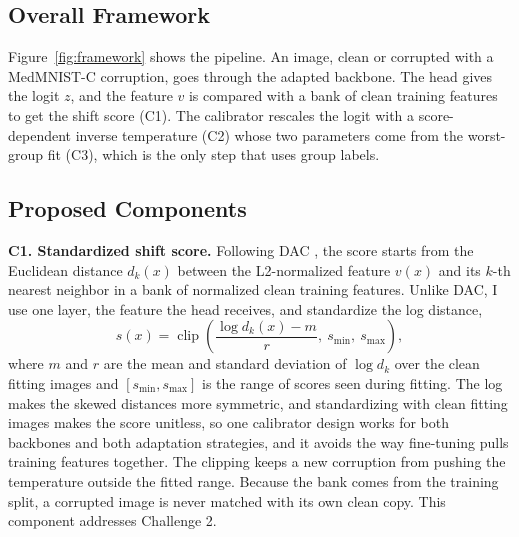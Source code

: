 \documentclass[sigconf,nonacm]{acmart}
\begin{document}
\subsection{Overall Framework}

Figure~\ref{fig:framework} shows the pipeline. An image, clean or corrupted with a MedMNIST-C corruption, goes through the adapted backbone. The head gives the logit $z$, and the feature $v$ is compared with a bank of clean training features to get the shift score (C1). The calibrator rescales the logit with a score-dependent inverse temperature (C2) whose two parameters come from the worst-group fit (C3), which is the only step that uses group labels.

\subsection{Proposed Components}
\label{sec:components}

\textbf{C1. Standardized shift score.} Following DAC \cite{tomani2023dac}, the score starts from the Euclidean distance $d_k(x)$ between the L2-normalized feature $v(x)$ and its $k$-th nearest neighbor in a bank of normalized clean training features. Unlike DAC, I use one layer, the feature the head receives, and standardize the log distance,
\begin{equation}
  s(x) = \operatorname{clip}\left(\frac{\log d_k(x) - m}{r},\ s_{\min},\ s_{\max}\right),
  \label{eq:score}
\end{equation}
where $m$ and $r$ are the mean and standard deviation of $\log d_k$ over the clean fitting images and $[s_{\min}, s_{\max}]$ is the range of scores seen during fitting. The log makes the skewed distances more symmetric, and standardizing with clean fitting images makes the score unitless, so one calibrator design works for both backbones and both adaptation strategies, and it avoids the way fine-tuning pulls training features together. The clipping keeps a new corruption from pushing the temperature outside the fitted range. Because the bank comes from the training split, a corrupted image is never matched with its own clean copy. This component addresses Challenge 2.
\end{document}
